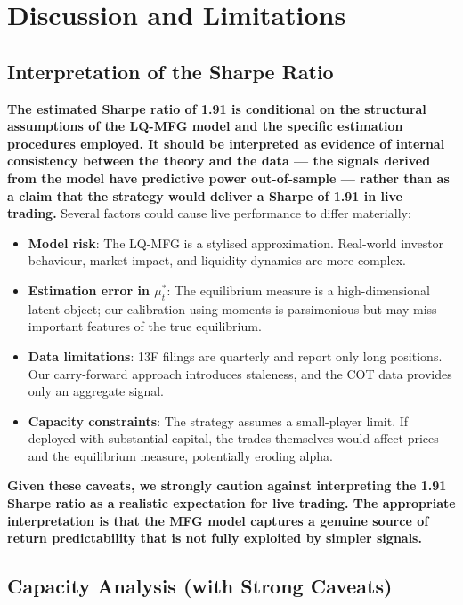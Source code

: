 \section{Discussion and Limitations}
\label{sec:emp-discussion}

\subsection{Interpretation of the Sharpe Ratio}

\textbf{The estimated Sharpe ratio of 1.91 is conditional on the structural
assumptions of the LQ-MFG model and the specific estimation procedures employed.
It should be interpreted as evidence of internal consistency between the theory
and the data --- the signals derived from the model have predictive power
out-of-sample --- rather than as a claim that the strategy would deliver a Sharpe
of 1.91 in live trading.} Several factors could cause live performance to differ
materially:

\begin{itemize}
    \item \textbf{Model risk}: The LQ-MFG is a stylised approximation. Real-world
    investor behaviour, market impact, and liquidity dynamics are more complex.
    \item \textbf{Estimation error in $\mu_t^*$}: The equilibrium measure is a
    high-dimensional latent object; our calibration using moments is parsimonious
    but may miss important features of the true equilibrium.
    \item \textbf{Data limitations}: 13F filings are quarterly and report only
    long positions. Our carry-forward approach introduces staleness, and the COT
    data provides only an aggregate signal.
    \item \textbf{Capacity constraints}: The strategy assumes a small-player
    limit. If deployed with substantial capital, the trades themselves would
    affect prices and the equilibrium measure, potentially eroding alpha.
\end{itemize}

\textbf{Given these caveats, we strongly caution against interpreting the 1.91
Sharpe ratio as a realistic expectation for live trading. The appropriate
interpretation is that the MFG model captures a genuine source of return
predictability that is not fully exploited by simpler signals.}

\subsection{Capacity Analysis (with Strong Caveats)}

